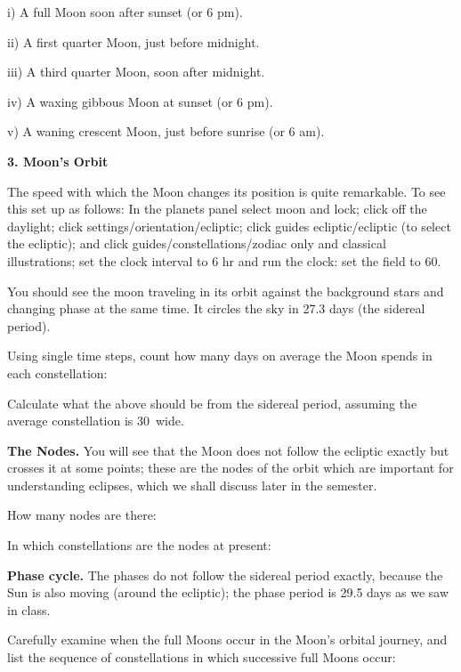 \documentclass[12pt]{article}
\begin{document}
\medskip
i) A full Moon soon after sunset (or 6 pm). 

ii) A first quarter Moon, just before midnight.

iii) A third quarter Moon, soon after midnight.

iv) A waxing gibbous Moon at sunset (or 6 pm).

v) A waning crescent Moon, just before sunrise (or 6 am).

\vspace{9cm}

\bigskip
\noindent
{\bf 3. Moon's Orbit}

\medskip\noindent The speed with which the Moon changes its position
is quite remarkable. To see this set up as follows: In the planets
panel select moon and lock; click off the daylight; click
settings/orientation/ecliptic; click guides ecliptic/ecliptic (to
select the ecliptic); and click guides/constellations/zodiac only and
classical illustrations; set the clock interval to 6 hr and run the
clock: set the field to 60\deg.

You should see the moon traveling in its orbit against the background
stars and changing phase at the same time. It circles the sky in 27.3
days (the sidereal period).

\medskip
Using single time steps, count how many days on average the Moon spends in
each constellation:
\makebox[2cm]{\hrulefill}

\medskip
Calculate what the above should be from the sidereal period, assuming
the average constellation is 30\deg\ wide.  \makebox[2cm]{\hrulefill}

\medskip\noindent
{\bf The Nodes.}  You will see that the Moon does not follow the ecliptic exactly but crosses it
at some points; these are the nodes of the orbit which are important
for understanding eclipses, which we shall discuss later in the
semester.

\medskip
How many nodes are there: \makebox[2cm]{\hrulefill}

In which constellations are the nodes at present:
\makebox[2cm]{\hrulefill}
 
\medskip\noindent
{\bf Phase cycle.} The phases do not follow the sidereal period
exactly, because the Sun is also
moving (around the ecliptic); the phase period is 29.5 days as we saw
in class.

Carefully examine when the full Moons occur in the Moon's orbital
journey, and list the sequence of constellations in which successive
full Moons occur: \makebox[4cm]{\hrulefill}
\end{document}
